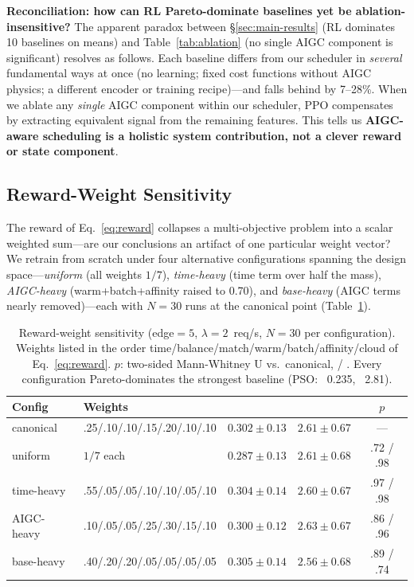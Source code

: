 \textbf{Reconciliation: how can RL Pareto-dominate baselines
yet be ablation-insensitive?} The apparent paradox between
\S\ref{sec:main-results} (RL dominates 10 baselines on means)
and Table~\ref{tab:ablation} (no single AIGC component is
significant) resolves as follows. Each baseline differs from
our scheduler in \emph{several} fundamental ways at once (no
learning; fixed cost functions without AIGC physics; a
different encoder or training recipe)---and falls behind by
7--28\%. When we ablate any \emph{single} AIGC component
within our scheduler, PPO compensates by extracting
equivalent signal from the remaining features. This tells us
\textbf{AIGC-aware scheduling is a holistic system
contribution, not a clever reward or state component}.

\subsection{Reward-Weight Sensitivity}
\label{sec:weight-sens}

The reward of Eq.~\ref{eq:reward} collapses a multi-objective
problem into a scalar weighted sum---are our conclusions an
artifact of one particular weight vector? We retrain from
scratch under four alternative configurations spanning the
design space---\emph{uniform} (all weights $1/7$),
\emph{time-heavy} (time term over half the mass),
\emph{AIGC-heavy}
(warm{+}batch{+}affinity raised to 0.70), and
\emph{base-heavy} (AIGC terms nearly removed)---each with
$N{=}30$ runs at the canonical point
(Table~\ref{tab:weight-sens}).

\begin{table}[t]
  \centering
  \caption{Reward-weight sensitivity (edge${=}5$,
    $\lambda{=}2$~req/s, $N{=}30$ per configuration). Weights
    listed in the order
    time/balance/match/warm/batch/affinity/cloud of
    Eq.~\ref{eq:reward}. $p$: two-sided Mann-Whitney U vs.\
    canonical, \slo{} / \etok. Every configuration
    Pareto-dominates the strongest baseline (PSO:
    \slo{}~0.235, \etok{}~2.81).}
  \label{tab:weight-sens}
  \scriptsize
  \setlength{\tabcolsep}{3pt}
  \begin{tabular}{@{}llccc@{}}
    \toprule
    Config & Weights & \slo{} & \etok{} & $p$ \\
    \midrule
    canonical & .25/.10/.10/.15/.20/.10/.10
      & $0.302 {\pm} 0.13$ & $2.61 {\pm} 0.67$ & --- \\
    uniform & $1/7$ each
      & $0.287 {\pm} 0.13$ & $2.61 {\pm} 0.68$ & .72 / .98 \\
    time-heavy & .55/.05/.05/.10/.10/.05/.10
      & $0.304 {\pm} 0.14$ & $2.60 {\pm} 0.67$ & .97 / .98 \\
    AIGC-heavy & .10/.05/.05/.25/.30/.15/.10
      & $0.300 {\pm} 0.12$ & $2.63 {\pm} 0.67$ & .86 / .96 \\
    base-heavy & .40/.20/.20/.05/.05/.05/.05
      & $0.305 {\pm} 0.14$ & $2.56 {\pm} 0.68$ & .89 / .74 \\
    \bottomrule
  \end{tabular}
\end{table}

